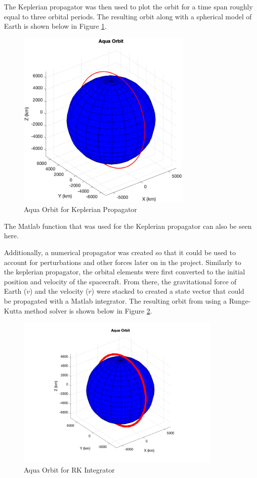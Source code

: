 The Keplerian propagator was then used to plot the orbit for a time span roughly equal to three orbital periods. The resulting orbit along with a spherical model of Earth is shown below in Figure \ref{fig:kep_orbit}.

\begin{figure}[H]
    \centering
    \includegraphics[width = 8.5cm]{Images/aqua_orbit_kepler.png}
    \caption{Aqua Orbit for Keplerian Propagator}
    \label{fig:kep_orbit}
\end{figure}

The Matlab function that was used for the Keplerian propagator can also be seen here.



Additionally, a numerical propagator was created so that it could be used to account for perturbations and other forces later on in the project. Similarly to the keplerian propagator, the orbital elements were first converted to the initial position and velocity of the spacecraft. From there, the gravitational force of Earth ($\dot v$) and the velocity ($\dot r$) were stacked to created a state vector that could be propagated with a Matlab integrator. The resulting orbit from using a Runge-Kutta method solver is shown below in Figure \ref{fig:numerical_orbit_rk}.


\begin{figure}[H]
    \centering
    \includegraphics[width = 10cm]{Images/ode45_orbit.png}
    \caption{Aqua Orbit for RK Integrator}
    \label{fig:numerical_orbit_rk}
\end{figure}

